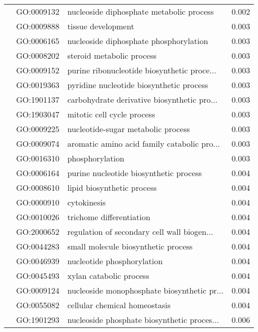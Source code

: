 \begin{longtable}{lllr}
   & GO:0009132 &     nucleoside diphosphate metabolic process &         0.002 \\
   & GO:0009888 &                           tissue development &         0.003 \\
   & GO:0006165 &       nucleoside diphosphate phosphorylation &         0.003 \\
   & GO:0008202 &                    steroid metabolic process &         0.003 \\
   & GO:0009152 &  purine ribonucleotide biosynthetic proce... &         0.003 \\
   & GO:0019363 &     pyridine nucleotide biosynthetic process &         0.003 \\
   & GO:1901137 &  carbohydrate derivative biosynthetic pro... &         0.003 \\
   & GO:1903047 &                   mitotic cell cycle process &         0.003 \\
   & GO:0009225 &           nucleotide-sugar metabolic process &         0.003 \\
   & GO:0009074 &  aromatic amino acid family catabolic pro... &         0.003 \\
   & GO:0016310 &                              phosphorylation &         0.003 \\
   & GO:0006164 &       purine nucleotide biosynthetic process &         0.004 \\
   & GO:0008610 &                   lipid biosynthetic process &         0.004 \\
   & GO:0000910 &                                  cytokinesis &         0.004 \\
   & GO:0010026 &                     trichome differentiation &         0.004 \\
   & GO:2000652 &  regulation of secondary cell wall biogen... &         0.004 \\
   & GO:0044283 &          small molecule biosynthetic process &         0.004 \\
   & GO:0046939 &                   nucleotide phosphorylation &         0.004 \\
   & GO:0045493 &                      xylan catabolic process &         0.004 \\
   & GO:0009124 &  nucleoside monophosphate biosynthetic pr... &         0.004 \\
   & GO:0055082 &                cellular chemical homeostasis &         0.004 \\
   & GO:1901293 &  nucleoside phosphate biosynthetic proces... &         0.006 \\

\end{longtable}
